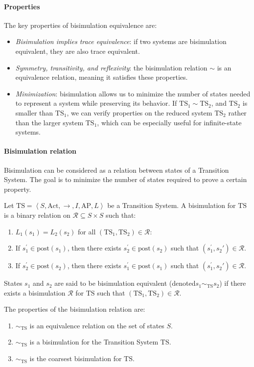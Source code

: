 \paragraph*{Properties}
The key properties of bisimulation equivalence are: 
\begin{itemize}
    \item \textit{Bisimulation implies trace equivalence}: if two systems are bisimulation equivalent, they are also trace equivalent.
    \item \textit{Symmetry, transitivity, and reflexivity}: the bisimulation relation $\sim$ is an equivalence relation, meaning it satisfies these properties.
    \item \textit{Minimization}: bisimulation allows us to minimize the number of states needed to represent a system while preserving its behavior. 
        If $\text{TS}_1\sim\text{TS}_2$, and $\text{TS}_2$ is smaller than $\text{TS}_1$, we can verify properties on the reduced system $\text{TS}_2$ rather than the larger system $\text{TS}_1$, which can be especially useful for infinite-state systems.
\end{itemize}

\paragraph*{Bisimulation relation}
Bisimulation can be considered as a relation between states of a Transition System. 
The goal is to minimize the number of states required to prove a certain property.
\begin{definition}
    Let $\text{TS}=\left\langle S,\text{Act},\rightarrow,I,\text{AP},L\right\rangle$ be a Transition System. 
    A bisimulation for $\text{TS}$ is a binary relation on $\mathcal{R}\subseteq S\times S$ such that:
    \begin{enumerate}
        \item $L_1(s_1)=L_2(s_2)$ for all $(\text{TS}_1,\text{TS}_2)\in\mathcal{R}$: 
        \item If $s_1^\prime\in\text{post}(s_1)$, then there exists $s_2^\prime\in\text{post}(s_2)$ such that $(s_1^\prime,s_2\prime)\in\mathcal{R}$. 
        \item If $s_2^\prime\in\text{post}(s_2)$, then there exists $s_1^\prime\in\text{post}(s_1)$ such that $(s_1^\prime,s_2\prime)\in\mathcal{R}$. 
    \end{enumerate}
    States $s_1$ and $s_2$ are said to be bisimulation equivalent (denoted$s_1\sim_{\text{TS}}s_2$) if there exists a bisimulation $\mathcal{R}$ for $\text{TS}$ such that $(\text{TS}_1,\text{TS}_2)\in\mathcal{R}$. 
\end{definition}
\noindent The properties of the bisimulation relation are: 
\begin{enumerate}
    \item $\sim_{\text{TS}}$ is an equivalence relation on the set of states $S$.
    \item $\sim_{\text{TS}}$ is a bisimulation for the Transition System $\text{TS}$. 
    \item $\sim_{\text{TS}}$ is the coarsest bisimulation for $\text{TS}$. 
\end{enumerate}

